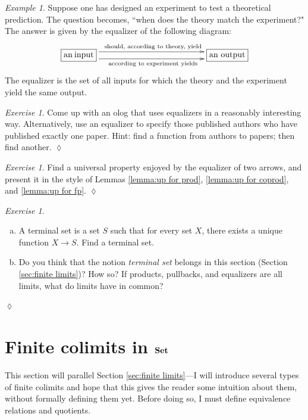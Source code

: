 \documentclass{book}
\def\tn{\textnormal}
\def\to{\rightarrow}
\newcommand{\obox}[3]{\stackrel{#1}{\fbox{\parbox{#2}{#3}}}}
\def\Set{{\bf Set}}
\theoremstyle{remark}
\newtheorem{example}[subsubsection]{Example}
\newtheorem{exc}[subsubsection]{Exercise}
\newenvironment{exercise}{\begin{exc}}{\hspace*{\fill}$\lozenge$\end{exc}}
\theoremstyle{definition}
\def\sexc{\begin{enumerate}[a.)]\setlength{\itemsep}{.1cm}\setlength{\parskip}{.1cm}\item}
\def\next{\item}
\def\endsexc{\end{enumerate}}
\begin{document}
\begin{example}

Suppose one has designed an experiment to test a theoretical prediction. The question becomes, ``when does the theory match the experiment?" The answer is given by the equalizer of the following diagram:
$$\xymatrix{
\obox{}{.5in}{an input}\ar@<1ex>[rr]^{\tn{should, according to theory, yield}}\ar@<-1ex>[rr]_{\tn{according to experiment yields}}&\hspace{1in}&\obox{}{.6in}{an output}
}$$
The equalizer is the set of all inputs for which the theory and the experiment yield the same output.

\end{example}

\begin{exercise}
Come up with an olog that uses equalizers in a reasonably interesting way. Alternatively, use an equalizer to specify those published authors who have published exactly one paper. Hint: find a function from authors to papers; then find another.
\end{exercise}

\begin{exercise}
Find a universal property enjoyed by the equalizer of two arrows, and present it in the style of Lemmas \ref{lemma:up for prod}, \ref{lemma:up for coprod}, and \ref{lemma:up for fp}.
\end{exercise}

\begin{exercise}\index{terminal object!in $\Set$}~
\sexc A terminal set is a set $S$ such that for every set $X$, there exists a unique function $X\to S$. Find a terminal set. 
\next Do you think that the notion {\em terminal set} belongs in this section (Section \ref{sec:finite limits})? How so? If products, pullbacks, and equalizers are all limits, what do limits have in common?
\endsexc
\end{exercise}


\section{Finite colimits in $\Set$}\label{sec:finite colimits}

This section will parallel Section \ref{sec:finite limits}---I will introduce several types of finite colimits and hope that this gives the reader some intuition about them, without formally defining them yet. Before doing so, I must define equivalence relations and quotients.
\end{document}
